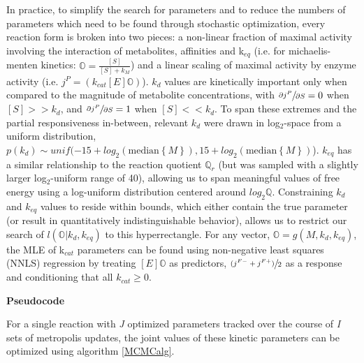 In practice, to simplify the search for parameters and to reduce the numbers of parameters which need to be found through stochastic optimization, every reaction form is broken into two pieces: a non-linear fraction of maximal activity involving the interaction of metabolites, affinities and k$_{eq}$ (i.e. for michaelis-menten kinetics: $\mathbb{O} = \frac{[S]}{[S] + k_{M}}$) and a linear scaling of maximal activity by enzyme activity (i.e. $j^{P} = (k_{cat}[E]\mathbb{O})$).  $k_{d}$ values are kinetically important only when compared to the magnitude of metabolite concentrations, with $\sfrac{\partial j^{P}}{\partial S} = 0$ when $[S] >> k_{d}$, and $\sfrac{\partial j^{P}}{\partial S} = 1$ when $[S] << k_{d}$.  To span these extremes and the partial responsiveness in-between, relevant $k_{d}$ were drawn in log$_{2}$-space from a uniform distribution, $p(k_{d}) \sim unif(-15 + log_{2}(\text{median}\left\{M\right\}), 15 + log_{2}(\text{median}\left\{M\right\})$).  $k_{eq}$ has a similar relationship to the reaction quotient $\mathbb{Q}_{r}$ (but was sampled with a slightly larger log$_{2}$-uniform range of 40), allowing us to span meaningful values of free energy using a log-uniform distribution centered around $log_{2}\mathbb{Q}$.  Constraining $k_{d}$ and $k_{eq}$ values to reside within bounds, which either contain the true parameter (or result in quantitatively indistinguishable behavior), allows us to restrict our search of $l(\mathbb{O}|k_{d}, k_{eq})$ to this hyperrectangle.  For any vector, $\mathbb{O} = g(M, k_{d}, k_{eq})$, the MLE of k$_{cat}$ parameters can be found using non-negative least squares (NNLS) regression by treating $[E]\mathbb{O}$ as predictors, $\sfrac{(j^{F-} + j^{F+})}{2}$ as a response and conditioning that all $k_{cat} \ge 0$.

\textbf{Pseudocode}

For a single reaction with \textit{J} optimized parameters tracked over the course of \textit{I} sets of metropolis updates, the joint values of these kinetic parameters can be optimized using algorithm \ref{MCMCalg}.

